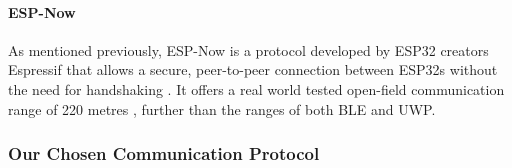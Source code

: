 {

\paragraph{ESP-Now}

As mentioned previously, ESP-Now is a protocol developed by ESP32 creators Espressif that allows a secure, peer-to-peer connection between ESP32s without the need for handshaking \cite{esp-now_overview}. It offers a real world tested open-field communication range of 220 metres \cite{random_nerd_tutorials}, further than the ranges of both BLE and UWP.



\subsubsection{Our Chosen Communication Protocol}

}
